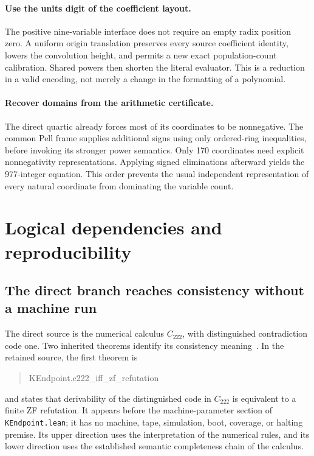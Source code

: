 \documentclass[11pt,a4paper]{article}
\theoremstyle{definition}
\begin{document}
\paragraph{Use the units digit of the coefficient layout.}
The positive nine-variable interface does not require an empty radix
position zero. A uniform origin translation preserves every source
coefficient identity, lowers the convolution height, and permits a new
exact population-count calibration. Shared powers then shorten the
literal evaluator. This is a reduction in a valid encoding, not merely a
change in the formatting of a polynomial.

\paragraph{Recover domains from the arithmetic certificate.}
The direct quartic already forces most of its coordinates to be
nonnegative. The common Pell frame supplies additional signs using only
ordered-ring inequalities, before invoking its stronger power semantics.
Only 170 coordinates need explicit nonnegativity representations.
Applying signed eliminations afterward yields the 977-integer equation.
This order prevents the usual independent representation of every
natural coordinate from dominating the variable count.





\section{Logical dependencies and reproducibility}
\label{sec:dependencies}

\subsection{The direct branch reaches consistency without a machine run}

The direct source is the numerical calculus $C_{222}$, with distinguished
contradiction code one. Two inherited theorems identify its consistency
meaning~\cite{calibration}. In the retained source, the first theorem is
\begin{quote}\small\ttfamily
KEndpoint.c222\_iff\_zf\_refutation
\end{quote}
and states that derivability of the distinguished code in $C_{222}$ is
equivalent to a finite ZF refutation. It appears before the
machine-parameter section of \texttt{KEndpoint.lean}; it has no machine,
tape, simulation, boot, coverage, or halting premise. Its upper direction
uses the interpretation of the numerical rules, and its lower direction
uses the established semantic completeness chain of the calculus.
\end{document}
